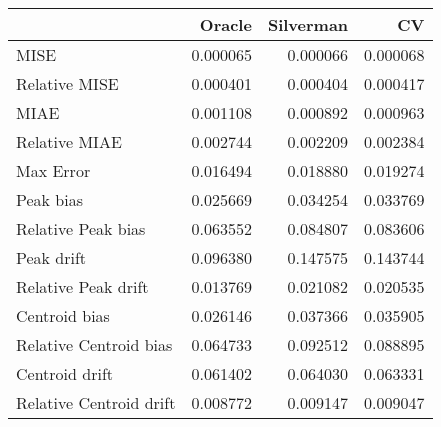 \begin{tabular}{lrrr}
  \hline
 & Oracle & Silverman & CV \\ 
  \hline
MISE & 0.000065 & 0.000066 & 0.000068 \\ 
  Relative MISE & 0.000401 & 0.000404 & 0.000417 \\ 
  MIAE & 0.001108 & 0.000892 & 0.000963 \\ 
  Relative MIAE & 0.002744 & 0.002209 & 0.002384 \\ 
  Max Error & 0.016494 & 0.018880 & 0.019274 \\ 
  Peak bias & 0.025669 & 0.034254 & 0.033769 \\ 
  Relative Peak bias & 0.063552 & 0.084807 & 0.083606 \\ 
  Peak drift & 0.096380 & 0.147575 & 0.143744 \\ 
  Relative Peak drift & 0.013769 & 0.021082 & 0.020535 \\ 
  Centroid bias & 0.026146 & 0.037366 & 0.035905 \\ 
  Relative Centroid bias & 0.064733 & 0.092512 & 0.088895 \\ 
  Centroid drift & 0.061402 & 0.064030 & 0.063331 \\ 
  Relative Centroid drift & 0.008772 & 0.009147 & 0.009047 \\ 
   \hline
\end{tabular}

